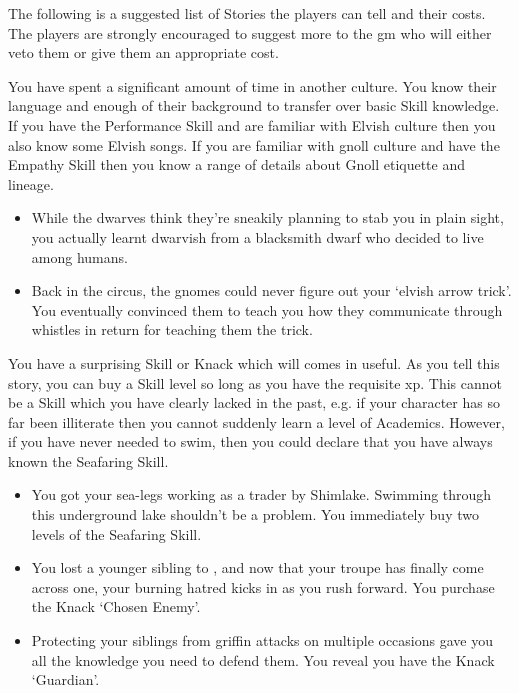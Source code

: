 \begin{multicols}{2}

\noindent
The following is a suggested list of Stories the players can tell and their costs.
The players are strongly encouraged to suggest more to the \gls{gm} who will either veto them or give them an appropriate cost.

\label{secondLanguage}
You have spent a significant amount of time in another culture.
You know their language and enough of their background to transfer over basic Skill knowledge.
If you have the Performance Skill and are familiar with Elvish culture then you also know some Elvish songs.
If you are familiar with gnoll culture and have the Empathy Skill then you know a range of details about Gnoll etiquette and lineage.

\begin{itemize}
\item While the dwarves think they're sneakily planning to stab you in plain sight, you actually learnt dwarvish from a blacksmith dwarf who decided to live among humans.
\item Back in the circus, the gnomes could never figure out your `elvish arrow trick'.
You eventually convinced them to teach you how they communicate through whistles in return for teaching them the trick.
\end{itemize}

\label{surpriseSkill}
You have a surprising Skill or Knack which will comes in useful.
As you tell this story, you can buy a Skill level so long as you have the requisite \gls{xp}.
This cannot be a Skill which you have clearly lacked in the past, e.g. if your character has so far been illiterate then you cannot suddenly learn a level of Academics.
However, if you have never needed to swim, then you could declare that you have always known the Seafaring Skill.

\begin{itemize}
  \item
  You got your sea-legs working as a trader by Shimlake.
  Swimming through this underground lake shouldn't be a problem.
  You immediately buy two levels of the Seafaring Skill.
  \item
  You lost a younger sibling to , and now that your troupe has finally come across one, your burning hatred kicks in as you rush forward.
  You purchase the Knack `Chosen Enemy'.
  \item
  Protecting your siblings from griffin attacks on multiple occasions gave you all the knowledge you need to defend them.
  You reveal you have the Knack `Guardian'.
\end{itemize}


\end{multicols}
